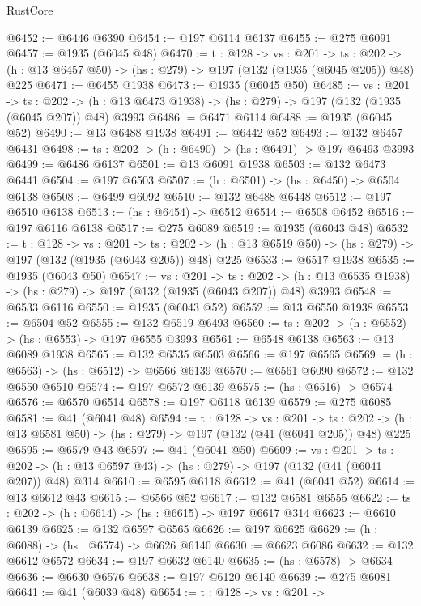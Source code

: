 \begin{lexlean}{RustCore}
\begin{coremodule}
@6452 := @6446 @6390
@6454 := @197 @6114 @6137
@6455 := @275 @6091
@6457 := @1935 (@6045 @48)
@6470 := {t : @128} ->
  {vs : @201} ->
  {ts : @202} -> (h : @13 @6457 @50) -> (hs : @279) -> @197 (@132 (@1935 (@6045 @205)) @48) @225
@6471 := @6455 @1938
@6473 := @1935 (@6045 @50)
@6485 := {vs : @201} ->
  {ts : @202} -> (h : @13 @6473 @1938) -> (hs : @279) -> @197 (@132 (@1935 (@6045 @207)) @48) @3993
@6486 := @6471 @6114
@6488 := @1935 (@6045 @52)
@6490 := @13 @6488 @1938
@6491 := @6442 @52
@6493 := @132 @6457 @6431
@6498 := {ts : @202} -> (h : @6490) -> (hs : @6491) -> @197 @6493 @3993
@6499 := @6486 @6137
@6501 := @13 @6091 @1938
@6503 := @132 @6473 @6441
@6504 := @197 @6503
@6507 := (h : @6501) -> (hs : @6450) -> @6504 @6138
@6508 := @6499 @6092
@6510 := @132 @6488 @6448
@6512 := @197 @6510 @6138
@6513 := (hs : @6454) -> @6512
@6514 := @6508 @6452
@6516 := @197 @6116 @6138
@6517 := @275 @6089
@6519 := @1935 (@6043 @48)
@6532 := {t : @128} ->
  {vs : @201} ->
  {ts : @202} -> (h : @13 @6519 @50) -> (hs : @279) -> @197 (@132 (@1935 (@6043 @205)) @48) @225
@6533 := @6517 @1938
@6535 := @1935 (@6043 @50)
@6547 := {vs : @201} ->
  {ts : @202} -> (h : @13 @6535 @1938) -> (hs : @279) -> @197 (@132 (@1935 (@6043 @207)) @48) @3993
@6548 := @6533 @6116
@6550 := @1935 (@6043 @52)
@6552 := @13 @6550 @1938
@6553 := @6504 @52
@6555 := @132 @6519 @6493
@6560 := {ts : @202} -> (h : @6552) -> (hs : @6553) -> @197 @6555 @3993
@6561 := @6548 @6138
@6563 := @13 @6089 @1938
@6565 := @132 @6535 @6503
@6566 := @197 @6565
@6569 := (h : @6563) -> (hs : @6512) -> @6566 @6139
@6570 := @6561 @6090
@6572 := @132 @6550 @6510
@6574 := @197 @6572 @6139
@6575 := (hs : @6516) -> @6574
@6576 := @6570 @6514
@6578 := @197 @6118 @6139
@6579 := @275 @6085
@6581 := @41 (@6041 @48)
@6594 := {t : @128} ->
  {vs : @201} ->
  {ts : @202} -> (h : @13 @6581 @50) -> (hs : @279) -> @197 (@132 (@41 (@6041 @205)) @48) @225
@6595 := @6579 @43
@6597 := @41 (@6041 @50)
@6609 := {vs : @201} ->
  {ts : @202} -> (h : @13 @6597 @43) -> (hs : @279) -> @197 (@132 (@41 (@6041 @207)) @48) @314
@6610 := @6595 @6118
@6612 := @41 (@6041 @52)
@6614 := @13 @6612 @43
@6615 := @6566 @52
@6617 := @132 @6581 @6555
@6622 := {ts : @202} -> (h : @6614) -> (hs : @6615) -> @197 @6617 @314
@6623 := @6610 @6139
@6625 := @132 @6597 @6565
@6626 := @197 @6625
@6629 := (h : @6088) -> (hs : @6574) -> @6626 @6140
@6630 := @6623 @6086
@6632 := @132 @6612 @6572
@6634 := @197 @6632 @6140
@6635 := (hs : @6578) -> @6634
@6636 := @6630 @6576
@6638 := @197 @6120 @6140
@6639 := @275 @6081
@6641 := @41 (@6039 @48)
@6654 := {t : @128} ->
  {vs : @201} ->

\end{coremodule}
\end{lexlean}
